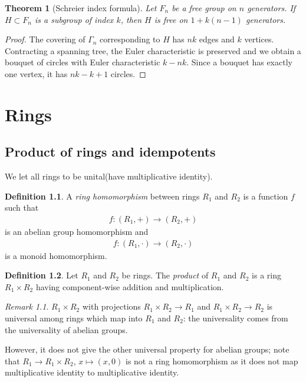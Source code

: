 \documentclass[12pt]{report}
\theoremstyle{plain}
\newtheorem{theorem}{Theorem}[section]
\theoremstyle{remark}
\newtheorem*{remark}{Remark}
\theoremstyle{definition}
\newtheorem{definition}[theorem]{Definition}
\begin{document}
\begin{theorem}[Schreier index formula]
    Let $F_n$ be a free group on $n$ generators. If $H\subset F_n$ is a subgroup of index $k$, then $H$ is free on $1+k(n-1)$ generators.
\end{theorem}
\begin{proof}
    The covering of $\Gamma_n$ corresponding to $H$ has $nk$ edges and $k$ vertices. Contracting a spanning tree, the Euler characteristic is preserved and we obtain a bouquet of circles with Euler characteristic $k-nk$. Since a bouquet has exactly one vertex, it has $nk-k+1$ circles.
\end{proof}




\chapter{Rings}
\section{Product of rings and idempotents}

We let all rings to be unital(have multiplicative identity).

\begin{definition}
    A \emph{ring homomorphism} between rings $R_1$ and $R_2$ is a function $f$ such that
    \begin{align*}
        f:(R_1,+)\rightarrow (R_2,+)
    \end{align*}
    is an abelian group homomorphism and
    \begin{align*}
        f:(R_1,\cdot)\rightarrow (R_2,\cdot)
    \end{align*}
    is a monoid homomorphism.
\end{definition}

\begin{definition}
    Let $R_1$ and $R_2$ be rings. The \emph{product} of $R_1$ and $R_2$ is a ring $R_1\times R_2$ having component-wise addition and multiplication.
\end{definition}
\begin{remark}
    $R_1\times R_2$ with projections $R_1\times R_2\rightarrow R_1$ and $R_1\times R_2\rightarrow R_2$ is universal among rings which map into $R_1$ and $R_2$: the universality comes from the universality of abelian groups.
    \begin{figure}[H]
    \centering
    \end{figure}
    \noindent
    However, it does not give the other universal property for abelian groups; note that $R_1\rightarrow R_1\times R_2$, $x\mapsto (x,0)$ is not a ring homomorphism as it does not map multiplicative identity to multiplicative identity.
\end{remark}
\end{document}
